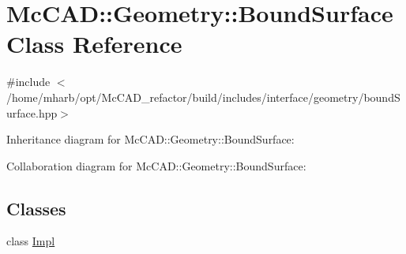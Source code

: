 \hypertarget{classMcCAD_1_1Geometry_1_1BoundSurface}{}\section{Mc\+C\+AD\+:\+:Geometry\+:\+:Bound\+Surface Class Reference}
\label{classMcCAD_1_1Geometry_1_1BoundSurface}


{\ttfamily \#include $<$/home/mharb/opt/\+Mc\+C\+A\+D\+\_\+refactor/build/includes/interface/geometry/bound\+Surface.\+hpp$>$}



Inheritance diagram for Mc\+C\+AD\+:\+:Geometry\+:\+:Bound\+Surface\+:


Collaboration diagram for Mc\+C\+AD\+:\+:Geometry\+:\+:Bound\+Surface\+:
\subsection*{Classes}
\begin{DoxyCompactItemize}
\item 
class \hyperlink{classMcCAD_1_1Geometry_1_1BoundSurface_1_1Impl}{Impl}
\end{DoxyCompactItemize}
